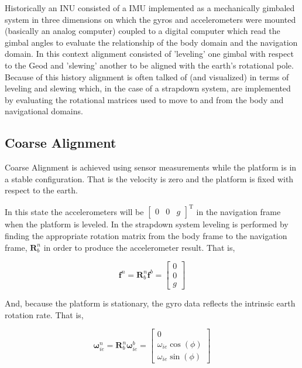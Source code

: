 \documentclass[a4paper]{report}
\numberwithin{equation}{chapter}
\newcommand{\mat}[1]{\boldsymbol{#1}}
\begin{document}
Historically an INU consisted of a IMU implemented as a mechanically gimbaled system in three dimensions on which the gyros and accelerometers were mounted (basically an analog computer) coupled to a digital computer which read the gimbal angles to evaluate the relationship of the body domain and the navigation domain. In this context alignment consisted of 'leveling' one gimbal with respect to the Geod and 'slewing' another to be aligned with the earth's rotational pole. Because of this history alignment is often talked of (and visualized) in terms of leveling and slewing which, in the case of a strapdown system, are implemented by evaluating the rotational matrices used to move to and from the body and navigational domains.

\subsection[Coarse Alignment]{Coarse Alignment}

Coarse Alignment is achieved using sensor measurements while the platform is in a stable configuration. That is the velocity is zero and the platform is fixed with respect to the earth.

In this state the accelerometers will be $\begin{bmatrix}0 & 0 & g\end{bmatrix}^{\mathrm{T}}$ in the navigation frame when the platform is leveled. In the strapdown system leveling is performed by finding the appropriate rotation matrix from the body frame to the navigation frame, $\mat{R}^n_b$ in order to produce the accelerometer result. That is,

\begin{equation}
\mat{f}^n = \mat{R}^n_b \mat{f}^b =
\begin{bmatrix}
0 \\
0 \\
g
\end{bmatrix}
\end{equation}

And, because the platform is stationary, the gyro data reflects the intrinsic earth rotation rate. That is,

\begin{equation}
\mat{\omega}_{ie}^n = \mat{R}^n_b \mat{\omega}^b_{ie} = 
\begin{bmatrix}
0 \\
\omega_{ie} \cos \left( \phi \right) \\
\omega_{ie} \sin \left( \phi \right)
\end{bmatrix}
\end{equation}
\end{document}
